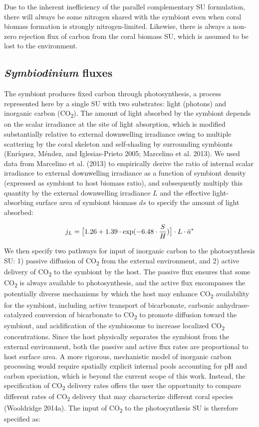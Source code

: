 \documentclass[]{elsarticle} %
\begin{document}
Due to the inherent inefficiency of the parallel complementary SU
formulation, there will always be some nitrogen shared with the symbiont
even when coral biomass formation is strongly nitrogen-limited.
Likewise, there is always a non-zero rejection flux of carbon from the
coral biomass SU, which is assumed to be lost to the environment.

\subsection{\texorpdfstring{\emph{Symbiodinium}
fluxes}{Symbiodinium fluxes}}\label{symbiodinium-fluxes}

The symbiont produces fixed carbon through photosynthesis, a process
represented here by a single SU with two substrates: light (photons) and
inorganic carbon (CO\textsubscript{2}). The amount of light absorbed by
the symbiont depends on the scalar irradiance at the site of light
absorption, which is modified substantially relative to external
downwelling irradiance owing to multiple scattering by the coral
skeleton and self-shading by surrounding symbionts (Enríquez, Méndez,
and Iglesias-Prieto 2005; Marcelino et al. 2013). We used data from
Marcelino et al. (2013) to empirically derive the ratio of internal
scalar irradiance to external downwelling irradiance as a function of
symbiont density (expressed as symbiont to host biomass ratio), and
subsequently multiply this quantity by the external downwelling
irradiance \(L\) and the effective light-absorbing surface area of
symbiont biomass \(ds\) to specify the amount of light absorbed:

\begin{equation} j_L = \big[1.26 + 1.39 \cdot \exp(-6.48 \cdot {S \over H})\big] \cdot L \cdot \bar{a}^* \end{equation}

We then specify two pathways for input of inorganic carbon to the
photosynthesis SU: 1) passive diffusion of CO\textsubscript{2} from the
external environment, and 2) active delivery of CO\textsubscript{2} to
the symbiont by the host. The passive flux ensures that some
CO\textsubscript{2} is always available to photosynthesis, and the
active flux encompasses the potentially diverse mechanisms by which the
host may enhance CO\textsubscript{2} availability for the symbiont,
including active transport of bicarbonate, carbonic anhydrase-catalyzed
conversion of bicarbonate to CO\textsubscript{2} to promote diffusion
toward the symbiont, and acidification of the symbiosome to increase
localized CO\textsubscript{2} concentrations. Since the host physically
separates the symbiont from the external environment, both the passive
and active flux rates are proportional to host surface area. A more
rigorous, mechanistic model of inorganic carbon processing would require
spatially explicit internal pools accounting for pH and carbon
speciation, which is beyond the current scope of this work. Instead, the
specification of CO\textsubscript{2} delivery rates offers the user the
opportunity to compare different rates of CO\textsubscript{2} delivery
that may characterize different coral species (Wooldridge 2014a). The
input of CO\textsubscript{2} to the photosynthesis SU is therefore
specified as:
\end{document}
